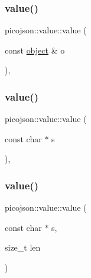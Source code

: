 \hypertarget{classpicojson_1_1value_a2b6beb88edf85e213893b805b354c87e}{}\label{classpicojson_1_1value_a2b6beb88edf85e213893b805b354c87e} 
\subsubsection{\texorpdfstring{value()}{value()}\hspace{0.1cm}{\footnotesize\ttfamily [7/10]}}
{\footnotesize\ttfamily picojson\+::value\+::value (\begin{DoxyParamCaption}\item[{const \hyperlink{classpicojson_1_1value_a7d7da11d54d7b983a902d28367bda9c1}{object} \&}]{o }\end{DoxyParamCaption})\hspace{0.3cm}{\ttfamily [inline]}, {\ttfamily [explicit]}}

\hypertarget{classpicojson_1_1value_a94f324d88fd16c1338fc9a228ec3dc3c}{}\label{classpicojson_1_1value_a94f324d88fd16c1338fc9a228ec3dc3c} 
\subsubsection{\texorpdfstring{value()}{value()}\hspace{0.1cm}{\footnotesize\ttfamily [8/10]}}
{\footnotesize\ttfamily picojson\+::value\+::value (\begin{DoxyParamCaption}\item[{const char $\ast$}]{s }\end{DoxyParamCaption})\hspace{0.3cm}{\ttfamily [inline]}, {\ttfamily [explicit]}}

\hypertarget{classpicojson_1_1value_ae56da06e2b438f4425300a218150398d}{}\label{classpicojson_1_1value_ae56da06e2b438f4425300a218150398d} 
\subsubsection{\texorpdfstring{value()}{value()}\hspace{0.1cm}{\footnotesize\ttfamily [9/10]}}
{\footnotesize\ttfamily picojson\+::value\+::value (\begin{DoxyParamCaption}\item[{const char $\ast$}]{s,  }\item[{size\+\_\+t}]{len }\end{DoxyParamCaption})\hspace{0.3cm}{\ttfamily [inline]}}

